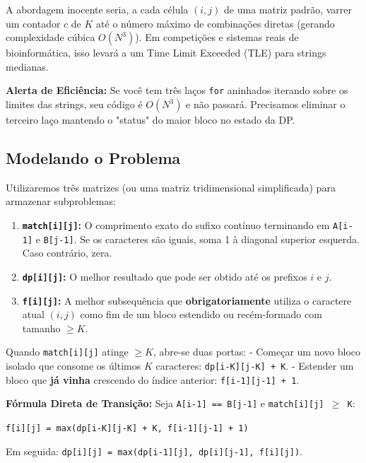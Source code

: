 \documentclass[11pt,a4paper]{article}
\begin{document}
A abordagem inocente seria, a cada célula $(i,j)$ de uma matriz padrão, varrer um contador $c$ de $K$ até o número máximo de combinações diretas (gerando complexidade cúbica $O(N^3)$). Em competições e sistemas reais de bioinformática, isso levará a um Time Limit Exceeded (TLE) para strings medianas.

\begin{warnbox}
\textbf{Alerta de Eficiência:}
Se você tem três laços \texttt{for} aninhados iterando sobre os limites das strings, seu código é $O(N^3)$ e não passará. Precisamos eliminar o terceiro laço mantendo o "status" do maior bloco no estado da DP.
\end{warnbox}

\subsection*{Modelando o Problema}

Utilizaremos três matrizes (ou uma matriz tridimensional simplificada) para armazenar subproblemas:
\begin{enumerate}
    \item \textbf{\texttt{match[i][j]}:} O comprimento exato do sufixo contínuo terminando em \texttt{A[i-1]} e \texttt{B[j-1]}. Se os caracteres são iguais, soma 1 à diagonal superior esquerda. Caso contrário, zera.
    \item \textbf{\texttt{dp[i][j]}:} O melhor resultado que pode ser obtido até os prefixos $i$ e $j$.
    \item \textbf{\texttt{f[i][j]}:} A melhor subsequência que \textbf{obrigatoriamente} utiliza o caractere atual $(i,j)$ como fim de um bloco estendido ou recém-formado com tamanho $\ge K$.
\end{enumerate}

Quando \texttt{match[i][j]} atinge $\ge K$, abre-se duas portas:
- Começar um novo bloco isolado que consome os últimos $K$ caracteres: \texttt{dp[i-K][j-K] + K}.
- Estender um bloco que \textbf{já vinha} crescendo do índice anterior: \texttt{f[i-1][j-1] + 1}.

\begin{successbox}
\textbf{Fórmula Direta de Transição:}
Seja \texttt{A[i-1] == B[j-1]} e \texttt{match[i][j] $\ge$ K}:
\begin{center}
    \texttt{f[i][j] = max(dp[i-K][j-K] + K, f[i-1][j-1] + 1)}
\end{center}
Em seguida: \texttt{dp[i][j] = max(dp[i-1][j], dp[i][j-1], f[i][j])}.
\end{successbox}
\end{document}
